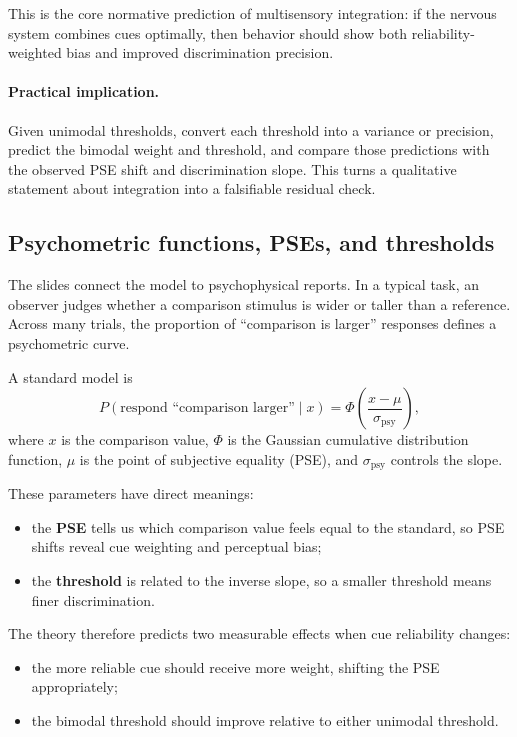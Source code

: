 This is the core normative prediction of multisensory integration: if the nervous system combines cues optimally, then behavior should show both reliability-weighted bias and improved discrimination precision.

\paragraph{Practical implication.}
Given unimodal thresholds, convert each threshold into a variance or precision, predict the bimodal weight and threshold, and compare those predictions with the observed PSE shift and discrimination slope. This turns a qualitative statement about integration into a falsifiable residual check.

\subsection{Psychometric functions, PSEs, and thresholds}

The slides connect the model to psychophysical reports. In a typical task, an observer judges whether a comparison stimulus is wider or taller than a reference. Across many trials, the proportion of ``comparison is larger'' responses defines a psychometric curve.

A standard model is
\[
P(\text{respond ``comparison larger''}\mid x)
=
\Phi\left(\frac{x-\mu}{\sigma_{\mathrm{psy}}}\right),
\]
where \(x\) is the comparison value, \(\Phi\) is the Gaussian cumulative distribution function, \(\mu\) is the point of subjective equality (PSE), and \(\sigma_{\mathrm{psy}}\) controls the slope.

These parameters have direct meanings:
\begin{itemize}
    \item the \textbf{PSE} tells us which comparison value feels equal to the standard, so PSE shifts reveal cue weighting and perceptual bias;
    \item the \textbf{threshold} is related to the inverse slope, so a smaller threshold means finer discrimination.
\end{itemize}

The theory therefore predicts two measurable effects when cue reliability changes:
\begin{itemize}
    \item the more reliable cue should receive more weight, shifting the PSE appropriately;
    \item the bimodal threshold should improve relative to either unimodal threshold.
\end{itemize}

